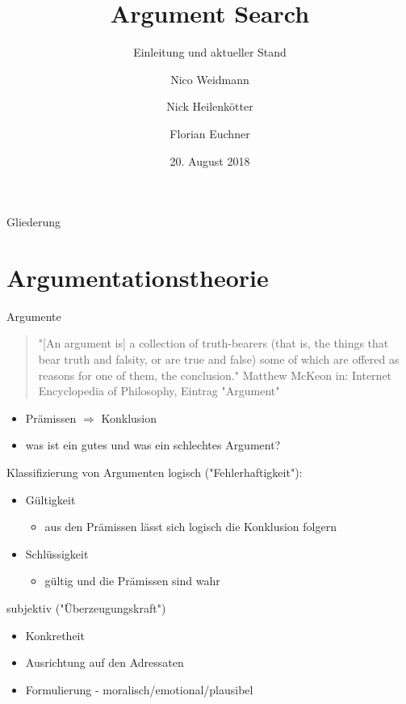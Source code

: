 \documentclass{beamer}
\title{Argument Search}
\subtitle{Einleitung und aktueller Stand}
\author{Nico Weidmann \and Nick Heilenkötter \and Florian Euchner}
\date{20. August 2018}
\begin{document}
	\begin{frame}
		\maketitle
	\end{frame}

	\begin{frame}{Gliederung}
		\tableofcontents
	\end{frame}

	\section{Argumentationstheorie}
	\begin{frame}{Argumente}
		\begin{quote}
			"[An argument is] a collection of truth-bearers (that is, the things that bear truth and falsity, or are true and false) some of which are offered as reasons for one of them, the conclusion."
			\flushright \tiny Matthew McKeon in: Internet Encyclopedia of Philosophy, Eintrag "Argument"
		\end{quote}
		\begin{itemize}[<+->]
			\item Prämissen $\Rightarrow$ Konklusion
			\item was ist ein gutes und was ein schlechtes Argument?
		\end{itemize}
	\end{frame}
	\begin{frame}{Klassifizierung von Argumenten}
		logisch ("Fehlerhaftigkeit"):
		\begin{itemize}[<+->]
			\item Gültigkeit
			\begin{itemize}
				\item aus den Prämissen lässt sich logisch die Konklusion folgern
			\end{itemize}
			\item Schlüssigkeit
			\begin{itemize}
				\item gültig und die Prämissen sind wahr
			\end{itemize}
		\end{itemize}
		subjektiv ("Überzeugungskraft")		\begin{itemize}[<+->]
			\item Konkretheit
			\item Ausrichtung auf den Adressaten
			\item Formulierung - moralisch/emotional/plausibel
		\end{itemize}
	\end{frame}
\end{document}

